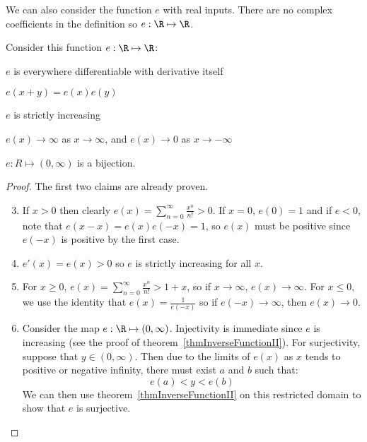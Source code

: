 \documentclass[../Main.tex]{subfiles}
\begin{document}
We can also consider the function $e$ with real inputs. There are no complex coefficients in the definition so $e : \R \mapsto \R$.
\begin{propositions}{
        Consider this function $e : \R \mapsto \R$:
        \label{propsExpRealProps}
    }   
    \item $e$ is everywhere differentiable with derivative itself \label{propExpDifferentiableReal}
    \item $e(x + y) = e(x) e(y)$ \label{propExpAdditivityReal}
    \item $e$ is strictly increasing \label{propExpIncreasing}
    \item $e(x) \to \infty$ as $x \to \infty$, and $e(x) \to 0$ as $x \to -\infty$ \label{propExpLimits}
    \item $e : R \mapsto (0, \infty)$ is a bijection. \label{propExpBijection}
\end{propositions}
\begin{proof}
    The first two claims are already proven.
    \begin{enumerate}
        \setcounter{enumi}{2} %
        \item If $x > 0$ then clearly $e(x) = \sum_{n = 0}^\infty \frac{x^n}{n!} > 0$.
            If $x = 0$, $e(0) = 1$ and if $e < 0$, note that $e(x - x) = e(x) e(-x) = 1$, so $e(x)$ must be positive since $e(-x)$ is positive by the first case.
        \item $e'(x) = e(x) > 0$ so $e$ is strictly increasing for all $x$.
        \item For $x \geq 0$, $e(x) = \sum_{n = 0}^\infty \frac{x^n}{n!} > 1 + x$, so if $x \to \infty$, $e(x) \to \infty$. For $x \leq 0$, we use the identity that $e(x) = \frac{1}{e(-x)}$ so if $e(-x) \to \infty$, then $e(x) \to 0$.
        \item Consider the map $e : \R \mapsto (0, \infty)$.
            Injectivity is immediate since $e$ is increasing (see the proof of theorem~\ref{thmInverseFunctionII}). For surjectivity, suppose that $y \in (0, \infty)$. Then due to the limits of $e(x)$ as $x$ tends to positive or negative infinity, there must exist $a$ and $b$ such that:
            \begin{equation*}
                e(a) < y < e(b)
            \end{equation*}
            We can then use theorem~\ref{thmInverseFunctionII} on this restricted domain to show that $e$ is surjective.
    \end{enumerate}
\end{proof}
\end{document}
